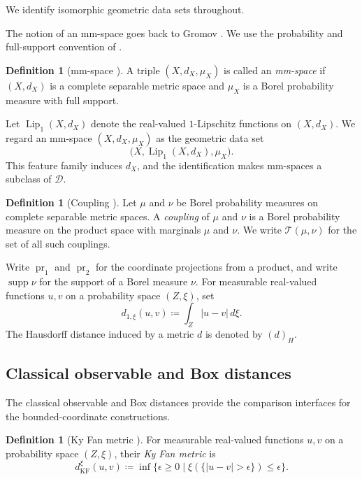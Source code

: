 \documentclass[11pt]{amsart}
\theoremstyle{plain}
\theoremstyle{definition}
\newtheorem{definition}[theorem]{Definition}
\theoremstyle{remark}
\newcommand{\D}{\mathcal D}
\newcommand{\T}{\mathcal T}
\newcommand{\kf}{d_{\operatorname{KF}}}
\DeclareMathOperator{\pr}{pr}
\DeclareMathOperator{\supp}{supp}
\begin{document}
We identify isomorphic geometric data sets throughout.

The notion of an mm-space goes back to Gromov \cite[Definition~3\(\frac12\).1, p.~113]{gromov2007met}. We use the probability and full-support convention of \cite[Definition~2.8]{shioya2016mmg}.

\begin{definition}[mm-space {\cite[Definition~2.8]{shioya2016mmg}}]
\label{def:mm-space}
A triple $(X,d_X,\mu_X)$ is called an \emph{mm-space} if $(X,d_X)$ is a complete separable metric space and $\mu_X$ is a Borel probability measure with full support.
\end{definition}

Let $\operatorname{Lip}_1(X,d_X)$ denote the real-valued $1$-Lipschitz functions on $(X,d_X)$. We regard an mm-space $(X,d_X,\mu_X)$ as the geometric data set
\[\bigl(X,\operatorname{Lip}_1(X,d_X),\mu_X\bigr).\]
This feature family induces $d_X$, and the identification makes mm-spaces a subclass of $\D$.

\begin{definition}[Coupling {\cite[Definition~1.20]{shioya2016mmg}}]
\label{def:coupling}
Let $\mu$ and $\nu$ be Borel probability measures on complete separable metric spaces. A \emph{coupling} of $\mu$ and $\nu$ is a Borel probability measure on the product space with marginals $\mu$ and $\nu$. We write $\T(\mu,\nu)$ for the set of all such couplings.
\end{definition}

Write $\pr_1$ and $\pr_2$ for the coordinate projections from a product, and write $\supp\nu$ for the support of a Borel measure $\nu$. For measurable real-valued functions $u,v$ on a probability space $(Z,\xi)$, set
\[d_{1,\xi}(u,v)\coloneqq\int_Z|u-v|\,d\xi.\]
The Hausdorff distance induced by a metric $d$ is denoted by $(d)_H$.

\subsection{Classical observable and Box distances}
\label{subsec:classical-distances}

The classical observable and Box distances provide the comparison interfaces for the bounded-coordinate constructions.

\begin{definition}[Ky Fan metric {\cite[Definition~1.23]{shioya2016mmg}}]
\label{def:ky-fan}
For measurable real-valued functions $u,v$ on a probability space $(Z,\xi)$, their \emph{Ky Fan metric} is
\[\kf^\xi(u,v)\coloneqq\inf\{\epsilon\geq0\mid\xi(\{|u-v|>\epsilon\})\leq\epsilon\}.\]
\end{definition}
\end{document}
